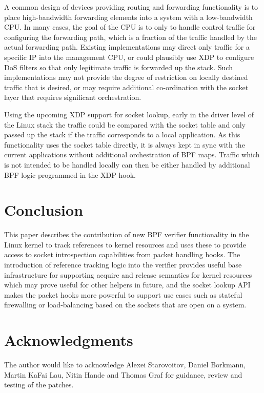 \documentclass[10pt,sigconf,authorversion]{lpc}
\newcommand\todo[1]{\textcolor{red}{#1}}
\begin{document}
A common design of devices providing routing and forwarding functionality is to
place high-bandwidth forwarding elements into a system with a low-bandwidth
CPU. In many cases, the goal of the CPU is to only to handle control traffic
for configuring the forwarding path, which is a fraction of the traffic handled
by the actual forwarding path. Existing implementations may direct only traffic
for a specific IP into the management CPU, or could plausibly use XDP to
configure DoS filters so that only legitimate traffic is forwarded up the
stack. Such implementations may not provide the degree of restriction on
locally destined traffic that is desired, or may require additional
co-ordination with the socket layer that requires significant orchestration.

Using the upcoming XDP support for socket lookup, early in the driver level of
the Linux stack the traffic could be compared with the socket table and only
passed up the stack if the traffic corresponds to a local application. As this
functionality uses the socket table directly, it is always kept in sync with
the current applications without additional orchestration of BPF maps. Traffic
which is not intended to be handled locally can then be either handled by
additional BPF logic programmed in the XDP hook.

\section{Conclusion}

This paper describes the contribution of new BPF verifier functionality in the
Linux kernel to track references to kernel resources and uses these to provide
access to socket introspection capabilities from packet handling hooks. The
introduction of reference tracking logic into the verifier provides
useful base infrastructure for supporting acquire and release semantics for
kernel resources which may prove useful for other helpers in future, and the
socket lookup API makes the packet hooks more powerful to support use cases
such as stateful firewalling or load-balancing based on the sockets that are
open on a system.


\section{Acknowledgments}

The author would like to acknowledge Alexei Starovoitov, Daniel Borkmann,
Martin KaFai Lau, Nitin Hande and Thomas Graf for guidance, review and testing
of the patches.



\end{document}
